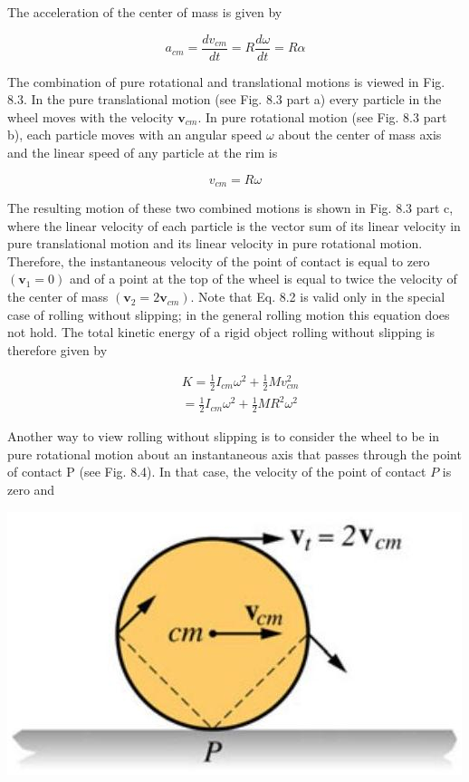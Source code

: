 \documentclass[10pt]{article}
\begin{document}
The acceleration of the center of mass is given by

$$
a_{c m}=\frac{d v_{c m}}{d t}=R \frac{d \omega}{d t}=R \alpha
$$

The combination of pure rotational and translational motions is viewed in Fig. 8.3. In the pure translational motion (see Fig. 8.3 part a) every particle in the wheel moves with the velocity $\mathbf{v}_{c m}$. In pure rotational motion (see Fig. 8.3 part b), each particle moves with an angular speed $\omega$ about the center of mass axis and the linear speed of any particle at the rim is


\begin{equation*}
v_{c m}=R \omega \tag{8.2}
\end{equation*}


The resulting motion of these two combined motions is shown in Fig. 8.3 part c, where the linear velocity of each particle is the vector sum of its linear velocity in pure translational motion and its linear velocity in pure rotational motion. Therefore, the instantaneous velocity of the point of contact is equal to zero $\left(\mathbf{v}_{1}=0\right)$ and of a point at the top of the wheel is equal to twice the velocity of the center of mass $\left(\mathbf{v}_{2}=2 \mathbf{v}_{c m}\right)$. Note that Eq. 8.2 is valid only in the special case of rolling without slipping; in the general rolling motion this equation does not hold. The total kinetic energy of a rigid object rolling without slipping is therefore given by

$$
\begin{aligned}
& K=\frac{1}{2} I_{c m} \omega^{2}+\frac{1}{2} M v_{c m}^{2} \\
& =\frac{1}{2} I_{c m} \omega^{2}+\frac{1}{2} M R^{2} \omega^{2}
\end{aligned}
$$

Another way to view rolling without slipping is to consider the wheel to be in pure rotational motion about an instantaneous axis that passes through the point of contact P (see Fig. 8.4). In that case, the velocity of the point of contact $P$ is zero and

\begin{center}
\includegraphics[max width=\textwidth]{2024_09_13_db1f357d2aad0a03eb2eg-132(3)}
\end{center}
\end{document}

